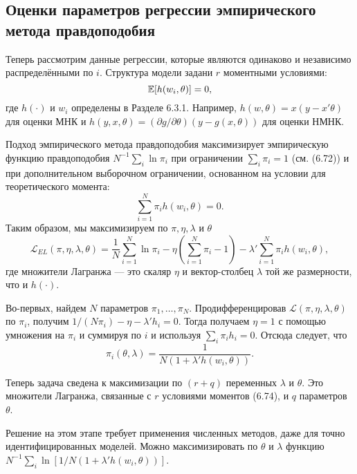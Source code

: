 \subsection{Оценки параметров регрессии эмпирического метода правдоподобия}

Теперь рассмотрим данные регрессии, которые являются одинаково и независимо распределёнными по $i$. Структура модели задани  $r$ моментными условиями:
\begin{equation}
\mathbb{E}[h(w_i,\theta)]=0,
\end{equation}
где $h(\cdot)$ и $w_i$ определены в Разделе 6.3.1. Например, $h(w,\theta)=x(y-x'\theta)$ для оценки МНК и $h(y,x,\theta)=(\partial g / \partial \theta)(y-g(x,\theta))$ для оценки НМНК.

Подход эмпирического метода правдоподобия максимизирует эмпирическую функцию правдоподобия $N^{-1} \sum_i \ln \pi_i$ при ограничении $\sum_i \pi_i=1$ (см. (6.72)) и при дополнительном выборочном ограничении, основанном на условии для теоретического момента:
\begin{equation}
\sum_{i=1}^{N} \pi_i h(w_i,\theta)=0.
\end{equation}
Таким образом, мы максимизируем по $\pi,\eta,\lambda$ и $\theta$
\begin{equation}
\mathcal{L}_{EL}(\pi,\eta,\lambda,\theta) = \frac{1}{N} \sum_{i=1}^{N} \ln \pi_i - \eta \left( \sum_{i=1}^{N} \pi_i -1 \right) - \lambda' \sum_{i=1}^{N} \pi_i h(w_i,\theta),
\end{equation}
где множители Лагранжа --- это скаляр $\eta$ и вектор-столбец $\lambda$ той же размерности, что и $h(\cdot)$.

Во-первых, найдем $N$ параметров $\pi_1, \dots, \pi_N$. Продифференцировав $\mathcal{L}(\pi,\eta,\lambda,\theta)$ по $\pi_i$, получим $1/(N \pi_i) -\eta-\lambda'h_i=0$. Тогда получаем $\eta=1$ с помощью умножения на $\pi_i$ и суммируя по $i$ и используя $\sum_i \pi_i h_i=0$. Отсюда следует, что
\begin{equation}
\pi_i(\theta,\lambda)=\frac{1}{N(1+\lambda'h(w_i,\theta))}.
\end{equation}

Теперь задача сведена к максимизации по $(r+q)$ переменных $\lambda$ и $\theta$. Это множители Лагранжа, связанные с $r$ условиями моментов (6.74), и $q$ параметров $\theta$.

Решение на этом этапе требует применения численных методов, даже для точно идентифицированных моделей. Можно максимизировать по $\theta$ и $\lambda$ функцию $N^{-1} \sum_i \ln [1/N(1+\lambda'h(w_i,\theta))]$.

